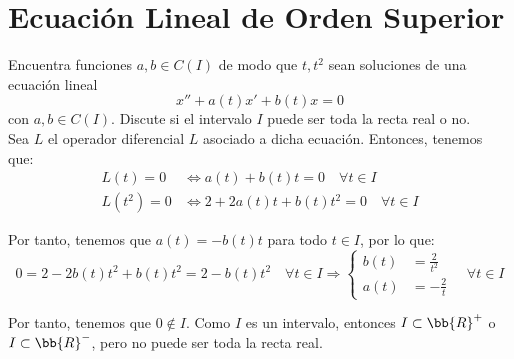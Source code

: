 \section{Ecuación Lineal de Orden Superior}

\begin{ejercicio}\label{ej:4.1}
    Encuentra funciones $a, b \in C(I)$ de modo que $t, t^2$ sean soluciones de una ecuación lineal
    \[
        x'' + a(t)x' + b(t)x = 0
    \]
    con $a, b \in C(I)$. Discute si el intervalo $I$ puede ser toda la recta real o no.\\

    Sea $L$ el operador diferencial $L$ asociado a dicha ecuación. Entonces, tenemos que:
    \begin{align*}
        L(t) = 0 & \Longleftrightarrow a(t) + b(t)t=0 \quad \forall t \in I\\
        L(t^2) = 0 & \Longleftrightarrow 2 + 2a(t)t + b(t)t^2 = 0 \quad \forall t \in I
    \end{align*}

    Por tanto, tenemos que $a(t)=-b(t)t$ para todo $t\in I$, por lo que:
    \begin{equation*}
        0=2-2b(t)t^2+b(t)t^2=2-b(t)t^2 \quad \forall t \in I
        \Longrightarrow \left\{
        \begin{aligned}
            b(t) &= \frac{2}{t^2}\\
            a(t) &= -\frac{2}{t}
        \end{aligned}
        \quad \forall t \in I
        \right.
    \end{equation*}

    Por tanto, tenemos que $0\notin I$. Como $I$ es un intervalo, entonces $I\subset \bb{R}^+$ o $I\subset \bb{R}^-$, pero no puede ser toda la recta real.
\end{ejercicio}

